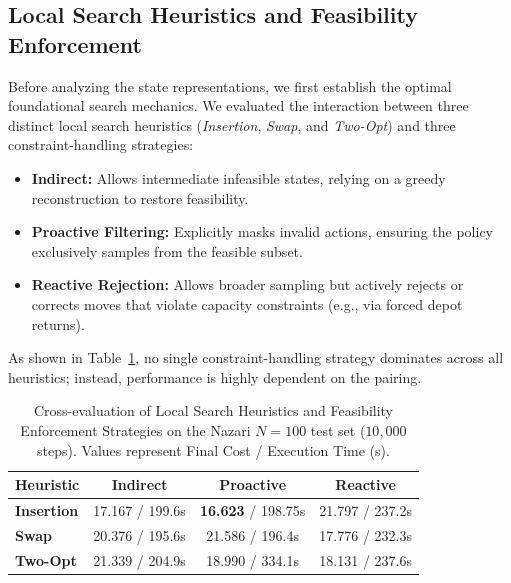 \documentclass[letterpaper]{article} %
\begin{document}

\subsection{Local Search Heuristics and Feasibility Enforcement}
\label{sec:heuristics_feasibility}

Before analyzing the state representations, we first establish the optimal foundational search mechanics. We evaluated the interaction between three distinct local search heuristics (\textit{Insertion}, \textit{Swap}, and \textit{Two-Opt}) and three constraint-handling strategies:
\begin{itemize}
    \item \textbf{Indirect:} Allows intermediate infeasible states, relying on a greedy reconstruction to restore feasibility.
    \item \textbf{Proactive Filtering:} Explicitly masks invalid actions, ensuring the policy exclusively samples from the feasible subset.
    \item \textbf{Reactive Rejection:} Allows broader sampling but actively rejects or corrects moves that violate capacity constraints (e.g., via forced depot returns).
\end{itemize}

As shown in Table~\ref{tab:heuristic_feasibility}, no single constraint-handling strategy dominates across all heuristics; instead, performance is highly dependent on the pairing. 

\begin{table}[h]
\centering
\small
\caption{Cross-evaluation of Local Search Heuristics and Feasibility Enforcement Strategies on the Nazari $N=100$ test set ($10{,}000$ steps). Values represent Final Cost / Execution Time (s).}
\label{tab:heuristic_feasibility}
\begin{tabular}{l c c c}
\toprule
\textbf{Heuristic} & \textbf{Indirect} & \textbf{Proactive} & \textbf{Reactive} \\
\midrule
\textbf{Insertion} & 17.167 / 199.6s & \textbf{16.623} / 198.75s & 21.797 / 237.2s \\
\textbf{Swap} & 20.376 / 195.6s & 21.586 / 196.4s & 17.776 / 232.3s \\
\textbf{Two-Opt} & 21.339 / 204.9s & 18.990 / 334.1s & 18.131 / 237.6s \\
\bottomrule
\end{tabular}
\end{table}
\end{document}
